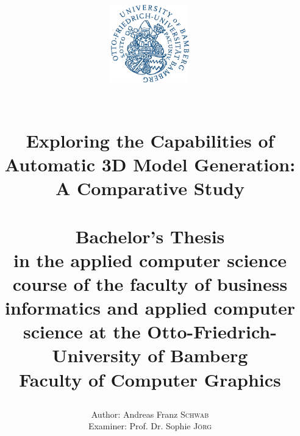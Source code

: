 \title{ 
    \vspace{-4cm}
    \begin{figure}[h]
    \centering
    \includegraphics[width=0.3\textwidth]{figures/ub_logo.png}
    \end{figure}
    \vspace{1cm}
	\HRule{2pt}\\
	\LARGE \textbf{Exploring the Capabilities of Automatic 3D Model Generation: A Comparative Study}\\
	\HRule{2pt}\\
	\vspace{2cm}
	\normalsize Bachelor's Thesis\\
	\vspace{0.5cm}
	in the applied computer science course of the faculty of business informatics and applied computer science at the Otto-Friedrich-University of Bamberg\\
	\vspace{0.5cm}
	Faculty of Computer Graphics\\
	\vspace{4cm} %
}

\date{}

\author{
    \begin{minipage}{\textwidth}
    \begin{flushleft}
    Author: Andreas Franz \textsc{Schwab}\\
    \vspace{0.5cm}
    Examiner: Prof. Dr. Sophie \textsc{Jörg}
    \end{flushleft}
    \end{minipage}
}

\maketitle